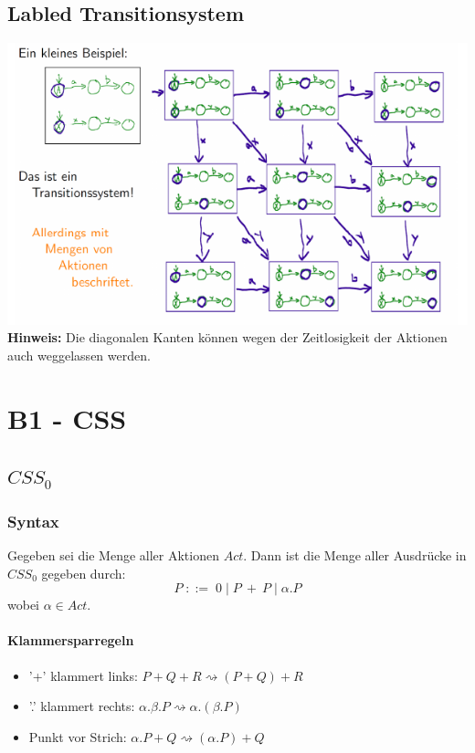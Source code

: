 \documentclass[a4paper,10pt, oneside]{book}
\begin{document}
\section{Labled Transitionsystem}
\begin{flushleft}
 \includegraphics{lts.png}
 \textbf{Hinweis:} Die diagonalen Kanten können wegen der Zeitlosigkeit der Aktionen auch weggelassen werden.
\end{flushleft}


\chapter{B1 - CSS}
\section{$CSS_0$}
\subsection{Syntax}
Gegeben sei die Menge aller Aktionen $Act$. Dann ist die Menge aller Ausdrücke in $CSS_0$ gegeben durch:
\begin{equation*}
 P \; ::= \; 0 \; | \; P \: + \: P \; | \; \alpha.P
\end{equation*}
wobei $\alpha \in Act$.

\subsubsection{Klammersparregeln}
\begin{itemize}
 \item '+' klammert links: $ P + Q + R \rightsquigarrow (P + Q) + R$
 \item '.' klammert rechts: $ \alpha.\beta.P \rightsquigarrow \alpha.(\beta.P)$
 \item Punkt vor Strich: $ \alpha.P + Q \rightsquigarrow (\alpha.P) + Q $
\end{itemize}
\end{document}
